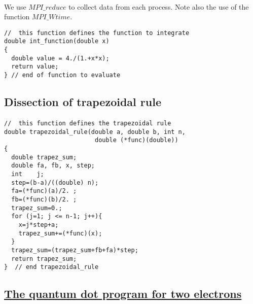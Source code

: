 \documentclass[%
oneside,                 %
final,                   %
10pt]{article}
\begin{document}
\paragraph{}

We use $MPI\_reduce$ to collect data from each process. Note also the use of the function 
$MPI\_Wtime$. 
\begin{verbatim}
//  this function defines the function to integrate
double int_function(double x)
{
  double value = 4./(1.+x*x);
  return value;
} // end of function to evaluate

\end{verbatim}



\subsection*{Dissection of trapezoidal rule}

\paragraph{}
\begin{verbatim}
//  this function defines the trapezoidal rule
double trapezoidal_rule(double a, double b, int n, 
                         double (*func)(double))
{
  double trapez_sum;
  double fa, fb, x, step;
  int    j;
  step=(b-a)/((double) n);
  fa=(*func)(a)/2. ;
  fb=(*func)(b)/2. ;
  trapez_sum=0.;
  for (j=1; j <= n-1; j++){
    x=j*step+a;
    trapez_sum+=(*func)(x);
  }
  trapez_sum=(trapez_sum+fb+fa)*step;
  return trapez_sum;
}  // end trapezoidal_rule 
\end{verbatim}





\subsection*{\href{{https://github.com/CompPhysics/ComputationalPhysics2/blob/gh-pages/doc/Programs/ParallelizationMPI/MPIvmcqdot.cpp}}{The quantum dot program for two electrons}}

\end{document}

